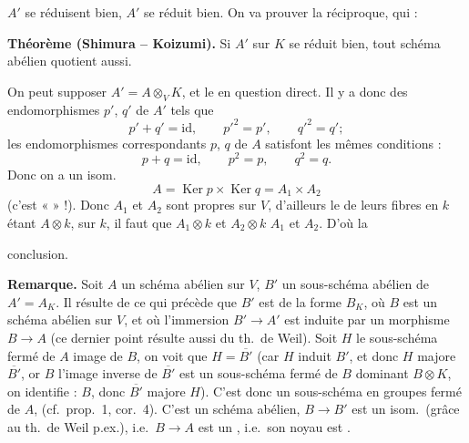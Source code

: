 \documentclass[11pt,a4paper]{article}
\begin{document}
$A'$ se réduisent bien, $A'$ se réduit bien. On va prouver la
réciproque, qui  :

\textbf{Théorème (Shimura -- Koizumi).} Si $A'$ sur $K$ se réduit bien,
tout schéma abélien quotient aussi.

On peut supposer  $A' = A \otimes_V K$, et le
 en question  direct. Il y a donc des
endomorphismes $p'$, $q'$ de $A'$ tels que
\[
  p' + q' = \mathrm{id}, \qquad p'^2 = p', \qquad q'^2 = q' ;
\]
les endomorphismes correspondants $p$, $q$ de $A$ satisfont les mêmes
conditions :
\[
  p + q = \mathrm{id}, \qquad p^2 = p, \qquad q^2 = q .
\]
Donc on a un isom.
\[
  A = \operatorname{Ker} p \times \operatorname{Ker} q = A_1 \times A_2
\]
(c'est «  » !). Donc $A_1$ et $A_2$ sont propres sur
$V$, d'ailleurs le  de leurs fibres en $k$ étant
$A \otimes k$,  \struck{\ill{}}  sur $k$, il faut que $A_1 \otimes k$ et $A_2 \otimes k$
 \ill{}  \ill{} \ill{} \ill{}
$A_1$ et $A_2$. D'où la
\marginal{\ill{}}

conclusion.

\textbf{Remarque.} Soit $A$ un schéma abélien sur $V$, $B'$ un
sous-schéma abélien de $A' = A_K$. Il résulte de ce qui précède que $B'$
est de la forme $B_K$, où $B$ est un schéma abélien sur $V$, et où
l'immersion $B' \to A'$ est induite par un morphisme $B \to A$ (ce dernier
point résulte aussi du th.\ de Weil).  Soit $H$ le
sous-schéma fermé de $A$ image de $B$, on voit 
 que $H = \overline{B'}$ (car $H$ induit
$B'$, et donc $H$ majore $\overline{B'}$, or $B$ l'image inverse de
$\overline{B'}$ est un sous-schéma fermé de $B$ dominant $B \otimes K$, on
identifie : $B$, donc $\overline{B'}$ majore $H$). C'est donc un
sous-schéma en groupes fermé de $A$, 
(cf.\ prop.~1, cor.~4). C'est un schéma abélien, 
$B \to B'$ est un isom.\ (grâce au th.\ de Weil p.ex.), i.e.\ $B \to A$ est
un , i.e.\ son noyau est \struck{\ill{}}
.
\end{document}

